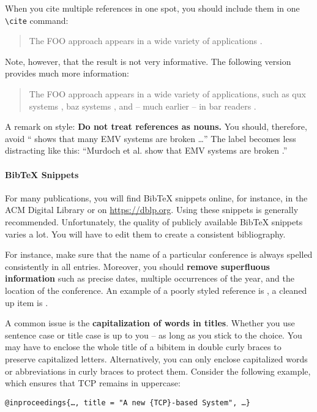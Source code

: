 When you cite multiple references in one spot, you should include them in one \verb|\cite| command:
\begin{quote}
  The FOO approach appears in a wide variety of applications \cite{murdoch_steven_j._chip_2010,anderson_ross_emv:_2014,kou_weidong_secure_2003}.
\end{quote}

Note, however, that the result is not very informative.%
The following version provides much more information:
\begin{quote}
The FOO approach appears in a wide variety of applications, such as qux systems \cite{murdoch_steven_j._chip_2010}, baz systems \cite{anderson_ross_emv:_2014}, and -- much earlier -- in bar readers \cite{kou_weidong_secure_2003}.
\end{quote}

A remark on style: \textbf{Do not treat references as nouns.} You should, therefore, avoid ``\cite{murdoch_steven_j._chip_2010} shows that many EMV systems are broken \ldots'' The label becomes less distracting like this: ``Murdoch et al. show that EMV systems are broken  \cite{murdoch_steven_j._chip_2010}.''

\paragraph{BibTeX Snippets}

For many publications, you will find BibTeX snippets online, for instance, in the ACM Digital Library or on \url{https://dblp.org}. Using these snippets is generally recommended. Unfortunately, the quality of publicly available BibTeX snippets varies a lot. You will have to edit them to create a consistent bibliography.

For instance,
 make sure that the name of a particular conference is always spelled consistently in all entries. Moreover, you should \textbf{remove superfluous information} such as precise dates, multiple occurrences of the year, and the location of the conference.%
An example of a poorly styled reference is \cite{BuchananRSS08}, a cleaned up item is \cite{DietrichKBF18}.

A common issue is the \textbf{capitalization of words in titles}.
Whether you use sentence case or title case is up to you -- as long as you stick to the choice. You may have to enclose the whole title of a bibitem in double curly braces to preserve capitalized letters. Alternatively, you can only enclose capitalized words or abbreviations in curly braces to protect them.%
Consider the following example, which ensures that TCP remains in uppercase:
\begin{verbatim}
@inproceedings{…, title = "A new {TCP}-based System", …}
\end{verbatim} 

